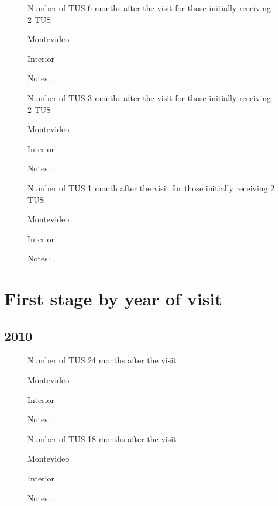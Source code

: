 \documentclass[12pt]{article}
\begin{document}
\begin{figure}[H]%
	\caption{Number of TUS 6 months after the visit for those initially receiving 2 TUS}%
	\centering
	\caption*{ {Montevideo}}
	\qquad
	\caption*{Interior}
	\label{fig:first_stage_si2Tus_tus6}%
	\caption*{ {\footnotesize Notes: .}}
\end{figure}

\begin{figure}[H]%
	\caption{Number of TUS 3 months after the visit for those initially receiving 2 TUS}%
	\centering
	\caption*{ {Montevideo}}
	\qquad
	\caption*{Interior}
	\label{fig:first_stage_si2Tus_tus3}%
	\caption*{ {\footnotesize Notes: .}}
\end{figure}

\begin{figure}[H]%
	\caption{Number of TUS 1 month after the visit for those initially receiving 2 TUS}%
	\centering
	\caption*{ {Montevideo}}
	\qquad
	\caption*{Interior}
	\label{fig:first_stage_si2Tus_tus1}%
	\caption*{ {\footnotesize Notes: .}}
\end{figure}

\section{First stage by year of visit}

\subsection{2010}

\begin{figure}[H]%
	\caption{Number of TUS 24 months after the visit}%
	\centering
	\caption*{ {Montevideo}}
	\qquad
	\caption*{Interior}
	\label{fig:first_stage_2010_tus24}%
	\caption*{ {\footnotesize Notes: .}}
\end{figure}

\begin{figure}[H]%
	\caption{Number of TUS 18 months after the visit}%
	\centering
	\caption*{ {Montevideo}}
	\qquad
	\caption*{Interior}
	\label{fig:first_stage_2010_tus18}%
	\caption*{ {\footnotesize Notes: .}}
\end{figure}
\end{document}
